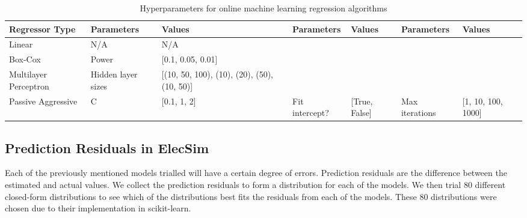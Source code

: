 \documentclass[final,3p,times,twocolumn,numbers]{elsarticle}
\begin{document}
\begin{table}

\qquad
\qquad
\qquad

\centering
\begin{tabular}{@{}llp{2.5cm}lllp{1.6cm}@{}}
\toprule
\textbf{Regressor Type} & \textbf{Parameters} & \textbf{Values}                                  & \textbf{Parameters} & \textbf{Values}   & \textbf{Parameters} & \textbf{Values}        \\ \midrule
Linear                  & N/A                 & N/A                                              &                     &                   &                     &                        \\
Box-Cox                 & Power               & {[}0.1, 0.05, 0.01{]}                            &                     &                   &                     &                        \\
Multilayer Perceptron   & Hidden layer sizes  & {[}(10, 50, 100), (10),  (20), (50), (10, 50){]} & 
                    &                   &                     &                        \\ 
                    Passive Aggressive      & C                   & {[}0.1, 1, 2{]}                                  & Fit intercept?      & {[}True, False{]} & Max iterations      & {[}1, 10, 100, 1000{]} \\
\bottomrule
\end{tabular}%
\caption{Hyperparameters for online machine learning regression algorithms}
\label{table:hyperparameter-tuning-online}
\end{table}%


\subsection{Prediction Residuals in ElecSim}

Each of the previously mentioned models trialled will have a certain degree of errors. Prediction residuals are the difference between the estimated and actual values. We collect the prediction residuals to form a distribution for each of the models. We then trial 80 different closed-form distributions to see which of the distributions best fits the residuals from each of the models. These 80 distributions were chosen due to their implementation in scikit-learn.
\end{document}

